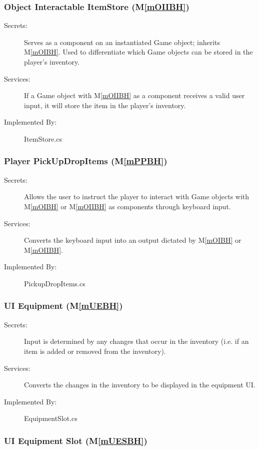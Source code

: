 \documentclass[12pt, titlepage]{article}
\newcommand{\mref}[1]{M\ref{#1}}
\begin{document}
\subsubsection{Object Interactable ItemStore (\mref{mOIIBH})}

\begin{description}
\item[Secrets:] Serves as a component on an instantiated Game object; inherits \mref{mOIBH}. Used to differentiate which Game objects can be stored in the player's inventory.
\item[Services:] If a Game object with \mref{mOIIBH} as a component receives a valid user input, it will store the item in the player's inventory.
\item[Implemented By:] ItemStore.cs
\end{description}

\subsubsection{Player PickUpDropItems  (\mref{mPPBH})}

\begin{description}
\item[Secrets:] Allows the user to instruct the player to interact with Game objects with \mref{mOIBH} or \mref{mOIIBH} as components through keyboard input.
\item[Services:] Converts the keyboard input into an output dictated by \mref{mOIBH} or \mref{mOIIBH}.
\item[Implemented By:] PickupDropItems.cs
\end{description}

\subsubsection{UI Equipment (\mref{mUEBH})}

\begin{description}
\item[Secrets:] Input is determined by any changes that occur in the inventory (i.e. if an item is added or removed from the inventory).
\item[Services:] Converts the changes in the inventory to be displayed in the equipment UI.
\item[Implemented By:] EquipmentSlot.cs
\end{description}

\subsubsection{UI Equipment Slot (\mref{mUESBH})}
\end{document}

